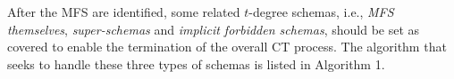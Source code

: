 \documentclass{sig-alternate}
\begin{document}
%


After the MFS are identified, some related $t$-degree schemas, i.e., \emph{MFS themselves}, \emph{super-schemas} and \emph{implicit forbidden schemas}, should be set as covered to enable the termination of the overall CT process. The algorithm that seeks to handle these three types of schemas is listed in Algorithm 1.
\end{document}
